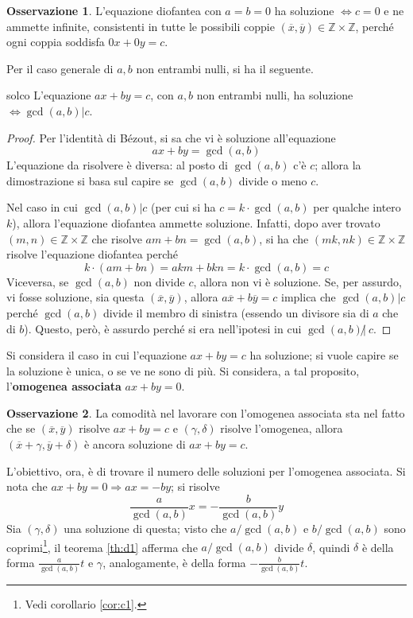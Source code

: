 \documentclass[11pt, a4paper]{scrartcl}
\theoremstyle{definition}
\numberwithin{esempio}{section}
\theoremstyle{definition}
\newtheorem{obs}{Osservazione}
\numberwithin{obs}{section}
\numberwithin{nota}{section}
\numberwithin{equation}{subsection}
\begin{document}
\begin{obs}
	L'equazione diofantea con $a=b=0$ ha soluzione $\iff c= 0$ e ne ammette infinite, consistenti in tutte le possibili coppie $(\overline{x},\overline{y}) \in \mathbb{Z}\times \mathbb{Z}$, perch\'e ogni coppia soddisfa $0 x + 0y = c$.
\end{obs}
Per il caso generale di $a,b$ non entrambi nulli, si ha il seguente.
\begin{teorema}
	{}{solco}
	L'equazione $ax + by = c$, con $a,b$ non entrambi nulli, ha soluzione $\iff \operatorname{gcd} (a,b )  | c$.
	\begin{proof}
		Per l'identit\`a di B\'ezout, si sa che vi \`e soluzione all'equazione 
		\[
		ax + by = \operatorname{gcd}(a,b) 
		\] 
		L'equazione da risolvere \`e diversa: al posto di $\operatorname{gcd}(a,b) $ c'\`e $c$; allora la dimostrazione si basa sul capire se $\operatorname{gcd}(a,b) $ divide o meno $c$.

		Nel caso in cui $\operatorname{gcd}(a,b) | c$ (per cui si ha $c = k\cdot \operatorname{gcd}(a,b) $ per qualche intero $k$), allora l'equazione diofantea ammette soluzione. Infatti, dopo aver trovato $(m,n) \in \mathbb{Z} \times \mathbb{Z}$ che risolve $am + bn = \operatorname{gcd}(a,b) $, si ha che $(m k , nk) \in \mathbb{Z} \times \mathbb{Z}$ risolve l'equazione diofantea perch\'e 
		\[
		k \cdot (am + bn ) = akm + bkn = k\cdot \operatorname{gcd}(a,b) = c
		\] 
		Viceversa, se $\operatorname{gcd}(a,b)$ non divide $c$, allora non vi \`e soluzione. Se, per assurdo, vi fosse soluzione, sia questa $(\overline{x},\overline{y})$, allora $a \overline{x}+ b \overline{y}=c$ implica che $\operatorname{gcd}(a,b) | c$ perch\'e $\operatorname{gcd}(a,b) $ divide il membro di sinistra (essendo un divisore sia di $a$ che di $b$). 
		Questo, per\`o, \`e assurdo perch\'e si era nell'ipotesi in cui $\operatorname{gcd}(a,b) \not | \ c$.
	\end{proof}
\end{teorema}
Si considera il caso in cui l'equazione $ax + by = c$ ha soluzione; si vuole capire se la soluzione \`e unica, o se ve ne sono di pi\`u. 
Si considera, a tal proposito, l'\textbf{omogenea associata} $ax + by = 0$. 
\begin{obs}
	La comodit\`a nel lavorare con l'omogenea associata sta nel fatto che se $(\overline{x}, \overline{y})$ risolve $ax + by = c$ e  $(\gamma, \delta )$ risolve l'omogenea, allora $(\overline{x}+\gamma, \overline{y}+\delta )$ \`e ancora soluzione di $ax + by = c$.
\end{obs}
\noindent L'obiettivo, ora, \`e di trovare il numero delle soluzioni per l'omogenea associata.
Si nota che $ax + by =0 \Rightarrow  ax = - by$; si risolve
\[
\frac{a}{\operatorname{gcd}(a,b) } x = - \frac{b}{\operatorname{gcd}(a,b) } y 
\] 
Sia $(\gamma, \delta )$ una soluzione di questa; visto che $a/\operatorname{gcd}(a,b) $ e $b / \operatorname{gcd}(a,b) $ sono coprimi\footnote{Vedi corollario \ref{cor:c1}.}, il teorema \ref{th:d1} afferma che $a / \operatorname{gcd}(a,b) $ divide $\delta $, quindi $\delta $ \`e della forma $\frac{a}{\operatorname{gcd}(a,b)}  t$ e $\gamma$, analogamente, \`e della forma $- \frac{b}{\operatorname{gcd}(a,b)} t$.
\end{document}
